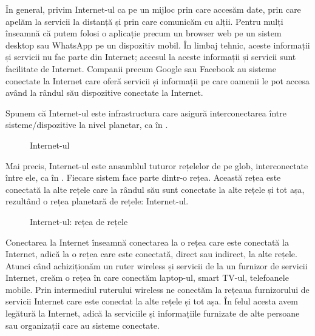 În general, privim Internet-ul ca pe un mijloc prin care accesăm date, prin care apelăm la servicii la distanță și prin care comunicăm cu alții. Pentru mulți înseamnă că putem folosi o aplicație precum un browser web pe un sistem desktop sau WhatsApp pe un dispozitiv mobil. În limbaj tehnic, aceste informații și servicii nu fac parte din Internet; accesul la aceste informații și servicii sunt facilitate de Internet. Companii precum Google sau Facebook au sisteme conectate la Internet care oferă servicii și informații pe care oamenii le pot accesa având la rândul său dispozitive conectate la Internet.

Spunem că Internet-ul este infrastructura care asigură interconectarea între sisteme/dispozitive la nivel planetar, ca în .

\begin{figure}[htbp]
  \centering
  \def\svgwidth{\columnwidth}
  
  \caption{Internet-ul}
  \label{fig:net:internet}
\end{figure}

Mai precis, Internet-ul este ansamblul tuturor rețelelor de pe glob, interconectate între ele, ca în . Fiecare sistem face parte dintr-o rețea. Această rețea este conectată la alte rețele care la rândul său sunt conectate la alte rețele și tot așa, rezultând o rețea planetară de rețele: Internet-ul.

\begin{figure}[htbp]
  \centering
  \def\svgwidth{\columnwidth}
  
  \caption{Internet-ul: rețea de rețele}
  \label{fig:net:internet-as-network}
\end{figure}

Conectarea la Internet înseamnă conectarea la o rețea care este conectată la Internet, adică la o rețea care este conectată, direct sau indirect, la alte rețele. Atunci când achiziționăm un ruter wireless și servicii de la un furnizor de servicii Internet, creăm o rețea în care conectăm laptop-ul, smart TV-ul, telefoanele mobile. Prin intermediul ruterului wireless ne conectăm la rețeaua furnizorului de servicii Internet care este conectat la alte rețele și tot așa. În felul acesta avem legătură la Internet, adică la serviciile și informațiile furnizate de alte persoane sau organizații care au sisteme conectate.

